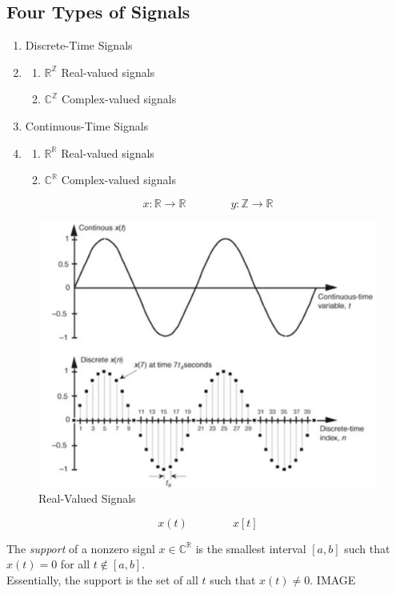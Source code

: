 \subsection*{Four Types of Signals}
\begin{enumerate}
    \item Discrete-Time Signals
    \item \begin{enumerate}
              \item $\mathbb{R}^{\mathbb{Z}}$ Real-valued signals
              \item $\mathbb{C}^{\mathbb{Z}}$ Complex-valued signals
          \end{enumerate}
    \item Continuous-Time Signals
    \item \begin{enumerate}
              \item $\mathbb{R}^{\mathbb{R}}$ Real-valued signals
              \item $\mathbb{C}^{\mathbb{R}}$ Complex-valued signals
          \end{enumerate}
\end{enumerate}

\begin{example}
    \[x : \mathbb{R} \to \mathbb{R} \qquad\qquad y : \mathbb{Z} \to \mathbb{R}\]
    \begin{figure}
        \includegraphics[scale=1]{./LECTURE_2/audio_5.png}
        \caption{Real-Valued Signals}
    \end{figure}
    \[x(t) \qquad \qquad x[t]\]
\end{example}
\begin{definition}
    [Support]
    The \textit{support} of a nonzero signl $x \in \mathbb{C}^\mathbb{R}$ is the smallest interval $[a,b]$ such that $x(t) = 0$ for all $t \notin [a,b]$. \\
    Essentially, the support is the set of all $t$ such that $x(t) \neq 0$.
    IMAGE
\end{definition}

